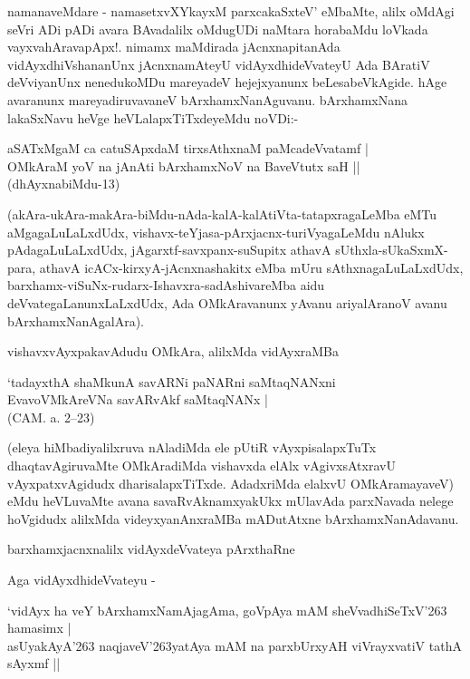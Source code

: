 namanaveMdare - namasetxvXYkayxM parxcakaSxteV' eMbaMte, alilx oMdAgi seVri ADi pADi avara BAvadalilx oMdugUDi naMtara horabaMdu loVkada vayxvahAravapApx!. nimamx maMdirada jAcnxnapitanAda vidAyxdhiVshananUnx jAcnxnamAteyU vidAyxdhideVvateyU Ada BAratiV deVviyanUnx nenedukoMDu mareyadeV hejejxyanunx beLesabeVkAgide. hAge avaranunx mareyadiruvavaneV bArxhamxNanAguvanu. bArxhamxNana lakaSxNavu heVge heVLalapxTiTxdeyeMdu noVDi:-

\begin{shloka}
aSATxMgaM ca catuSApxdaM tirxsAthxnaM paMcadeVvatamf |\\
OMkAraM yoV na jAnAti bArxhamxNoV na BaveVtutx saH ||\\
(dhAyxnabiMdu-13)
\end{shloka}

(akAra-ukAra-makAra-biMdu-nAda-kalA-kalAtiVta-tatapxragaLeMba eMTu aMgagaLuLaLxdUdx, vishavx-teYjasa-pArxjacnx-turiVyagaLeMdu nAlukx pAdagaLuLaLxdUdx, jAgarxtf-savxpanx-suSupitx athavA sUthxla-sUkaSxmX-para, athavA icACx-kirxyA-jAcnxnashakitx eMba mUru sAthxnagaLuLaLxdUdx, barxhamx-viSuNx-rudarx-Ishavxra-sadAshivareMba aidu deVvategaLanunxLaLxdUdx, Ada OMkAravanunx yAvanu ariyalAranoV avanu bArxhamxNanAgalAra).

vishavxvAyxpakavAdudu OMkAra, alilxMda vidAyxraMBa

\begin{shloka}
`tadayxthA shaMkunA savARNi paNARni saMtaqNANxni\\
EvavoVMkAreVNa savARvAkf saMtaqNANx |\\
(CAM. a. 2--23)
\end{shloka}

(eleya hiMbadiyalilxruva nAladiMda ele pUtiR vAyxpisalapxTuTx dhaqtavAgiruvaMte OMkAradiMda vishavxda elAlx vAgivxsAtxravU vAyxpatxvAgidudx dharisalapxTiTxde. AdadxriMda elalxvU OMkAramayaveV) eMdu heVLuvaMte avana savaRvAknamxyakUkx mUlavAda parxNavada nelege hoVgidudx alilxMda videyxyanAnxraMBa mADutAtxne bArxhamxNanAdavanu.

barxhamxjacnxnalilx vidAyxdeVvateya pArxthaRne

Aga vidAyxdhideVvateyu -

\begin{shloka}
`vidAyx ha veY bArxhamxNamAjagAma, goVpAya mAM sheVvadhiSeTxV\char'263 hamasimx |\\
asUyakAyA\char'263 naqjaveV\char'263yatAya mAM na parxbUrxyAH viVrayxvatiV tathA sAyxmf ||
\end{shloka}

